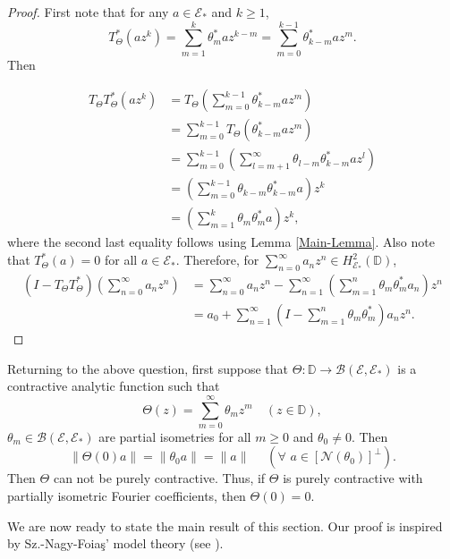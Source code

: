 \documentclass[12pt]{amsart}
\newcommand{\clb}{\mathcal{B}}
\newcommand{\cle}{\mathcal{E}}
\newcommand{\cln}{\mathcal{N}}
\newcommand{\D}{\mathbb{D}}
\newcommand{\E}{\mathcal{E}}
\theoremstyle{definition}
\theoremstyle{plain}
\theoremstyle{definition}
\numberwithin{equation}{section}
\begin{document}
\begin{proof}
First note that for any $a \in \cle_*$ and $k \geq 1$, 
\[
	T_{\Theta}^*(az^k)=\sum\limits_{m=1}^k \theta_m^*az^{k-m}=\sum\limits_{m=0}^{k-1} \theta_{k-m}^*az^m.
\]
Then

\begin{align*}
T_{\Theta}T_{\Theta}^* \left(a z^k \right) 
& = T_{\Theta} \left(\sum\limits_{m=0}^{k-1} \theta_{k-m}^*az^m\right)\\
&=\sum\limits_{m=0}^{k-1}T_\Theta(\theta_{k-m}^*az^m)\\
&=\sum\limits_{m=0}^{k-1}\left(\sum\limits_{l=m+1}^\infty \theta_{l-m}\theta_{k-m}^*az^l\right)\\
&=\left(\sum\limits_{m=0}^{k-1}\theta_{k-m}\theta_{k-m}^*a\right)z^k\\
&=\left(\sum\limits_{m=1}^{k}\theta_m\theta_m^*a\right)z^k,
\end{align*}
where the second last equality follows using Lemma \ref{Main-Lemma}. Also note that $T_\Theta^*(a)=0$ for all $a \in \cle_*$.
Therefore, for $\sum\limits_{n=0}^\infty a_n z^n \in H^2_{\cle_*}(\D)$, 
\begin{align*}
\left(I - T_{\Theta}T_{\Theta}^* \right)\left(\displaystyle \sum_{n=0}^{\infty}a_n z^n \right) 
&= \displaystyle \sum_{n=0}^{\infty}a_n z^n - \sum_{n=1}^{\infty} \left(\sum_{m=1}^{n} \theta_m \theta_m^* a_n\right) z^{n}\\
& = a_0 +  \sum_{n=1}^{\infty} \left( I - \sum_{m=1}^{n}\theta_m \theta_m^* \right) a_nz^n.
\end{align*}
\end{proof}



Returning to the above question, first suppose that $\Theta : \D \rightarrow \clb(\E,\E_*)$ is a contractive analytic function such that 
\[
\Theta( z)=\sum_{m=0}^\infty  \theta_mz^m\quad (z \in \D),
\]
$\theta_m \in \mathcal{B}(\E,\E_*)$ are partial isometries for all $m \geq  0$ and $\theta_0 \neq 0$. Then 
\[
\|\Theta(0)a\| = \|\theta_0 a\| = \| a\|\,\, \quad (\forall \,\, a \in [\cln(\theta_0)]^\perp).
\]
Then $\Theta$ can not be purely contractive.
Thus, if $\Theta$ is purely contractive with partially isometric Fourier coefficients, then $\Theta(0)=0$.

We are now ready to state the main result of this section. Our proof is inspired by Sz.-Nagy-Foia\c{s}' model theory (see \cite[Chapter VI]{sznagy}).
\end{document}
